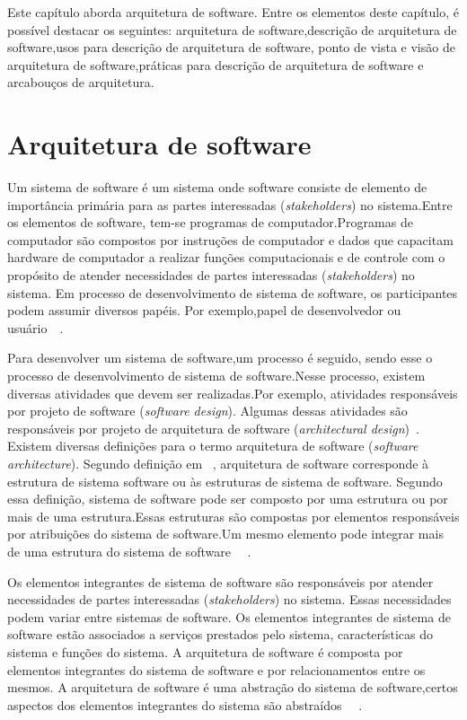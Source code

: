 Este capítulo aborda arquitetura de software. Entre os elementos deste capítulo, é possível destacar os seguintes: arquitetura de software,descrição de arquitetura de software,usos para  descrição de arquitetura de software, ponto de vista e visão de arquitetura de software,práticas para descrição de arquitetura de software e arcabouços de arquitetura.

\section{Arquitetura de software}

Um sistema de software é um sistema onde software consiste de elemento de importância primária para as partes interessadas (\emph{stakeholders}) no sistema.Entre os elementos de software, tem-se programas de computador.Programas de computador são compostos por instruções de computador e dados que capacitam hardware de computador a realizar funções computacionais e de controle com o propósito de atender necessidades de partes interessadas (\emph{stakeholders}) no sistema. Em processo de desenvolvimento de sistema de software, os participantes podem assumir diversos papéis. Por exemplo,papel de desenvolvedor ou usuário~\cite{Sevocab}~\cite{ISO_24765}.

Para desenvolver um sistema de software,um processo é seguido, sendo esse o processo de desenvolvimento de sistema de software.Nesse processo, existem diversas atividades que devem ser realizadas.Por exemplo, atividades responsáveis por projeto de software (\emph{software design}). Algumas dessas atividades  são responsáveis por projeto de arquitetura de software (\emph{architectural design})~\cite{Sommerville_2011_texbook}. Existem diversas definições para o termo arquitetura de software (\emph{software architecture}). Segundo definição em ~\cite{arq_01}, arquitetura de software corresponde à estrutura de sistema software ou às estruturas de sistema de software. Segundo essa definição, sistema de software pode ser composto por uma estrutura ou por mais de uma estrutura.Essas estruturas são compostas por elementos responsáveis por atribuições do sistema de software.Um mesmo elemento pode integrar mais de uma estrutura do sistema de software ~\cite{arq_01}~\cite{Carnegie_textbook}.

Os elementos integrantes de sistema de software são responsáveis
por atender necessidades de partes interessadas (\emph{stakeholders}) no sistema. 
Essas necessidades podem variar entre sistemas de software. Os elementos integrantes de sistema de software estão associados a serviços prestados pelo sistema, características do sistema e funções do sistema. A arquitetura de software é composta por elementos integrantes do sistema de software e por relacionamentos entre os mesmos. A arquitetura de software é uma abstração do sistema de software,certos aspectos dos elementos integrantes do sistema são abstraídos ~\cite{arq_01}~\cite{Carnegie_textbook}.

